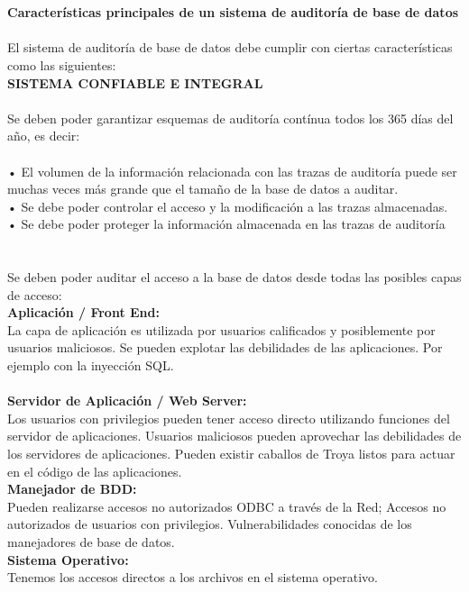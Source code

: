 \documentclass[twoside,twocolumn]{article}
\begin{document}
\begin{flushright}
\begin{itemize}
\textbf{}\\
\textbf{}\\
\textbf{Características principales de un sistema de auditoría de base de datos }\\
\textbf{}\\
El sistema de auditoría de base de datos debe cumplir con ciertas características como las siguientes:\textbf{}\\
\textbf{SISTEMA CONFIABLE E INTEGRAL }\\
\textbf{}\\
Se deben poder garantizar esquemas de auditoría contínua todos los 365 días del año, es decir: \textbf{}\\
\textbf{}\\
•	El volumen de la información relacionada con las trazas de auditoría puede ser muchas veces más grande que el tamaño de la base de datos a auditar. \textbf{}\\
•	Se debe poder controlar el acceso y la modificación a las trazas almacenadas. \textbf{}\\
•	Se debe poder proteger la información almacenada en las trazas de auditoría \textbf{}\\
 \textbf{}\\
 \textbf{}\\
Se deben poder auditar el acceso a la base de datos desde todas las posibles capas de acceso:
 \textbf{}\\ 
 \textbf{Aplicación / Front End:}\\ La capa de aplicación es utilizada por usuarios calificados y posiblemente por usuarios maliciosos. Se pueden explotar las debilidades de las aplicaciones. Por ejemplo con la inyección SQL.  \textbf{}\\ 
 \textbf{}\\ 
 \textbf{Servidor de Aplicación / Web Server: }\\  Los usuarios con privilegios pueden tener acceso directo utilizando funciones del servidor de aplicaciones. Usuarios maliciosos pueden aprovechar las debilidades de los servidores de aplicaciones. Pueden existir caballos de Troya listos para actuar en el código de las aplicaciones. 
 \textbf{}\\ 
 \textbf{Manejador de BDD:}\\ Pueden realizarse accesos no autorizados ODBC a través de la Red; Accesos no autorizados de usuarios con privilegios. Vulnerabilidades conocidas de los manejadores de base de datos. 
 \textbf{}\\ 
 \textbf{Sistema Operativo:}\\  Tenemos los accesos directos a los archivos en el sistema operativo.

\end{itemize}
\end{flushright}
\end{document}

